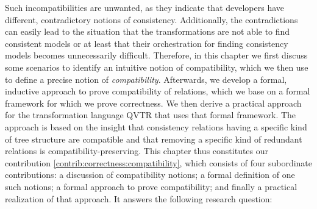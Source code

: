 Such incompatibilities are unwanted, as they indicate that developers have different, contradictory notions of consistency.
Additionally, the contradictions can easily lead to the situation that the transformations are not able to find consistent models or at least that their orchestration for finding consistency models becomes unnecessarily difficult.
Therefore, in this chapter we first discuss some scenarios to identify an intuitive notion of compatibility, which we then use to define a precise notion of \emph{compatibility}.
Afterwards, we develop a formal, inductive approach to prove compatibility of relations, which we base on a formal framework for which we prove correctness.
We then derive a practical approach for the transformation language \gls{QVTR} that uses that formal framework.
The approach is based on the insight that consistency relations having a specific kind of tree structure are compatible and that removing a specific kind of redundant relations is compatibility-preserving.
This chapter thus constitutes our contribution \autoref{contrib:correctness:compatibility}, which consists of four subordinate contributions: a discussion of compatibility notions; a formal definition of one such notions; a formal approach to prove compatibility; and finally a practical realization of that approach.
It answers the following research question:


